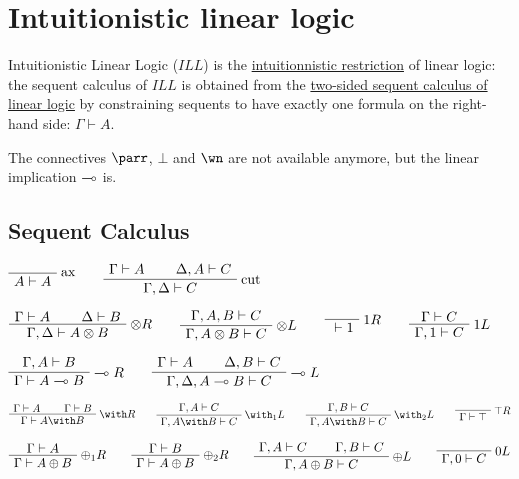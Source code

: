 \chapter{Intuitionistic linear logic}\label{intuitionistic-linear-logic}

Intuitionistic Linear Logic (\(ILL\)) is the
\href{intuitionnistic_restriction}{intuitionnistic restriction} of
linear logic: the sequent calculus of \(ILL\) is obtained from the
\href{Sequent_calculus\#Sequents_and_proofs}{two-sided sequent calculus
of linear logic} by constraining sequents to have exactly one formula on
the right-hand side: \(\Gamma\vdash A\).

The connectives \(\parr\), \(\bot\) and \(\wn\) are not available
anymore, but the linear implication \(\multimap\) is.

\section{Sequent Calculus}

\(\LabelRule{\rulename{ax}}
\NulRule{A\vdash A}
\DisplayProof
\qquad
\AxRule{\Gamma\vdash A}
\AxRule{\Delta,A\vdash C}
\LabelRule{\rulename{cut}}
\BinRule{\Gamma,\Delta\vdash C}
\DisplayProof\)

\(\AxRule{\Gamma\vdash A}
\AxRule{\Delta\vdash B}
\LabelRule{\tens R}
\BinRule{\Gamma,\Delta\vdash A\tens B}
\DisplayProof
\qquad
\AxRule{\Gamma,A,B\vdash C}
\LabelRule{\tens L}
\UnaRule{\Gamma,A\tens B\vdash C}
\DisplayProof
\qquad
\LabelRule{\one R}
\NulRule{{}\vdash\one}
\DisplayProof
\qquad
\AxRule{\Gamma\vdash C}
\LabelRule{\one L}
\UnaRule{\Gamma,\one\vdash C}
\DisplayProof\)

\(\AxRule{\Gamma,A\vdash B}
\LabelRule{\limp R}
\UnaRule{\Gamma\vdash A\limp B}
\DisplayProof
\qquad
\AxRule{\Gamma\vdash A}
\AxRule{\Delta,B\vdash C}
\LabelRule{\limp L}
\BinRule{\Gamma,\Delta,A\limp B\vdash C}
\DisplayProof\)

\(\AxRule{\Gamma\vdash A}
\AxRule{\Gamma\vdash B}
\LabelRule{\with R}
\BinRule{\Gamma\vdash A\with B}
\DisplayProof
\qquad
\AxRule{\Gamma,A\vdash C}
\LabelRule{\with_1 L}
\UnaRule{\Gamma,A\with B\vdash C}
\DisplayProof
\qquad
\AxRule{\Gamma,B\vdash C}
\LabelRule{\with_2 L}
\UnaRule{\Gamma,A\with B\vdash C}
\DisplayProof
\qquad
\LabelRule{\top R}
\NulRule{\Gamma\vdash\top}
\DisplayProof\)

\(\AxRule{\Gamma\vdash A}
\LabelRule{\plus_1 R}
\UnaRule{\Gamma\vdash A\plus B}
\DisplayProof
\qquad
\AxRule{\Gamma\vdash B}
\LabelRule{\plus_2 R}
\UnaRule{\Gamma\vdash A\plus B}
\DisplayProof
\qquad
\AxRule{\Gamma,A\vdash C}
\AxRule{\Gamma,B\vdash C}
\LabelRule{\plus L}
\BinRule{\Gamma,A\plus B\vdash C}
\DisplayProof
\qquad
\LabelRule{\zero L}
\NulRule{\Gamma,\zero\vdash C}
\DisplayProof\)

